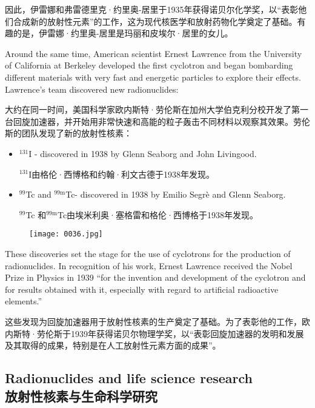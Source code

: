 \documentclass[dvipsnames, svgnames,a4paper,11pt]{article}
\begin{document}
因此，伊雷娜和弗雷德里克·约里奥-居里于1935年获得诺贝尔化学奖，以“表彰他们合成新的放射性元素”的工作，这为现代核医学和放射药物化学奠定了基础。有趣的是，伊雷娜·约里奥-居里是玛丽和皮埃尔·居里的女儿。

Around the same time, American scientist Ernest Lawrence from the University of California at Berkeley developed the first cyclotron and began bombarding different materials with very fast and energetic particles to explore their effects. Lawrence’s team discovered new radionuclides:

大约在同一时间，美国科学家欧内斯特·劳伦斯在加州大学伯克利分校开发了第一台回旋加速器，并开始用非常快速和高能的粒子轰击不同材料以观察其效果。劳伦斯的团队发现了新的放射性核素：

\begin{itemize}
      \item ${}^{131}$I - discovered in 1938 by Glenn Seaborg and John Livingood.

            ${}^{131}$I由格伦·西博格和约翰·利文古德于1938年发现。

      \item ${}^{99}$Tc and ${}^\text{99m}$Tc- discovered in 1938 by Emilio Segrè and Glenn Seaborg.

            ${}^{99}$Tc 和${}^\text{99m}$Tc由埃米利奥·塞格雷和格伦·西博格于1938年发现。

\end{itemize}

\begin{figure}[htbp]
      \centering
      \texttt{[image: 0036.jpg]}
       \label{fig26}
\end{figure}

These discoveries set the stage for the use of cyclotrons for the production of radionuclides. In recognition of his work, Ernest Lawrence received the Nobel Prize in Physics in 1939 “for the invention and development of the cyclotron and for results obtained with it, especially with regard to artificial radioactive elements.”

这些发现为回旋加速器用于放射性核素的生产奠定了基础。为了表彰他的工作，欧内斯特·劳伦斯于1939年获得诺贝尔物理学奖，以“表彰回旋加速器的发明和发展及其取得的成果，特别是在人工放射性元素方面的成果”。

\subsection{Radionuclides and life science research\\放射性核素与生命科学研究}
\end{document}
